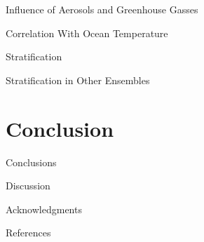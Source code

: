 \documentclass{beamer}
\begin{document}
\begin{frame}{Influence of Aerosols and Greenhouse Gasses}

\end{frame}

\begin{frame}{Correlation With Ocean Temperature}

\end{frame}

\begin{frame}{Stratification}

\end{frame}

\begin{frame}{Stratification in Other Ensembles}

\end{frame}

\section{Conclusion}

\begin{frame}{Conclusions}

\end{frame}

\begin{frame}{Discussion}

\end{frame}

\begin{frame}{Acknowledgments}

\end{frame}

\begin{frame}{References}
  
  
\end{frame}

\maketitle
\end{document}
